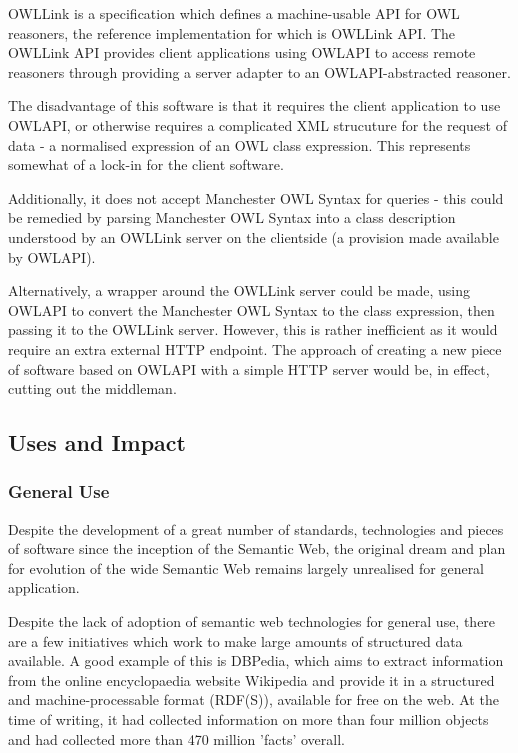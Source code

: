\documentclass{article}
\begin{document}
OWLLink is a specification which defines a machine-usable API for OWL reasoners,
the reference implementation for which is OWLLink API. The OWLLink API provides
client applications using OWLAPI to access remote reasoners through providing a
server adapter to an OWLAPI-abstracted reasoner. 

The disadvantage of this software is that it requires the client application
to use OWLAPI, or otherwise requires a complicated XML strucuture for the
request of data - a normalised expression of an OWL class expression. This
represents somewhat of a lock-in for the client software. 

Additionally, it does not accept Manchester OWL Syntax for queries - this could 
be remedied by parsing Manchester OWL Syntax into a class description understood 
by an OWLLink server on the clientside (a provision made available by OWLAPI).

Alternatively, a wrapper around the OWLLink server could be made, using OWLAPI
to convert the Manchester OWL Syntax to the class expression, then passing it to
the OWLLink server. However, this is rather inefficient as it would require an
extra external HTTP endpoint. The approach of creating a new piece of software 
based on OWLAPI with a simple HTTP server would be, in effect, cutting out the 
middleman.

\subsection{Uses and Impact}

\subsubsection{General Use}

Despite the development of a great number of standards, technologies and pieces
of software since the inception of the Semantic Web, the original
dream and plan for evolution of the wide Semantic Web remains largely unrealised
for general application.\cite{semweb}

Despite the lack of adoption of semantic web technologies for general use, there
are a few initiatives which work to make large amounts of structured data
available. A good example of this is DBPedia, which aims to extract
information from the online encyclopaedia website Wikipedia and provide it in a
structured and machine-processable format (RDF(S)), available for free on the 
web. At the time of writing, it had collected information on more than four 
million objects and had collected more than 470 million 'facts' overall.
\end{document}
